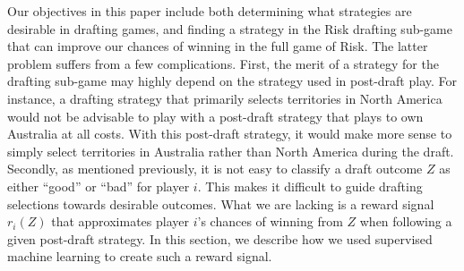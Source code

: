\documentclass[letterpaper]{article}
\numberwithin{equation}{section}
\numberwithin{theorem}{section}
\numberwithin{lemma}{section}
\numberwithin{df}{section}
\begin{document}
Our objectives in this paper include both determining what strategies are desirable in drafting games, and finding a strategy in the Risk drafting sub-game that can improve our chances of winning in the full game of Risk.  The latter problem suffers from a few complications.  First, the merit of a strategy for the drafting sub-game may highly depend on the strategy used in post-draft play.  For instance, a drafting strategy that primarily selects territories in North America would not be advisable to play with a post-draft strategy that plays to own Australia at all costs.  With this post-draft strategy, it would make more sense to simply select territories in Australia rather than North America during the draft.  Secondly, as mentioned previously, it is not easy to classify a draft outcome $Z$ as either ``good'' or ``bad'' for player $i$.  This makes it difficult to guide drafting selections towards desirable outcomes.  What we are lacking is a reward signal $r_i(Z)$ that approximates player $i$'s chances of winning from $Z$ when following a given post-draft strategy.  In this section, we describe how we used supervised machine learning to create such a reward signal.
\end{document}
